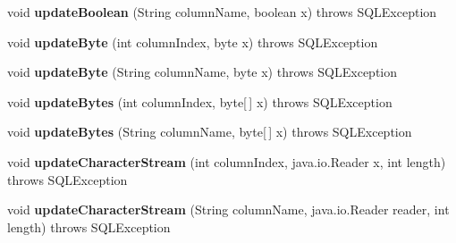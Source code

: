 \begin{DoxyCompactItemize}
void {\bfseries update\+Boolean} (String column\+Name, boolean x)  throws S\+Q\+L\+Exception 
\item 
\mbox{\label{classcom_1_1mysql_1_1cj_1_1jdbc_1_1result_1_1_result_set_impl_ac4d0f449cc4fd29b89f1ceb6b72209ae}} 
void {\bfseries update\+Byte} (int column\+Index, byte x)  throws S\+Q\+L\+Exception 
\item 
\mbox{\label{classcom_1_1mysql_1_1cj_1_1jdbc_1_1result_1_1_result_set_impl_ae8fd5cb7b758693b2db4729b2ffec9ae}} 
void {\bfseries update\+Byte} (String column\+Name, byte x)  throws S\+Q\+L\+Exception 
\item 
\mbox{\label{classcom_1_1mysql_1_1cj_1_1jdbc_1_1result_1_1_result_set_impl_a48efa493f35509f2dabf0b91d8b4a038}} 
void {\bfseries update\+Bytes} (int column\+Index, byte\mbox{[}$\,$\mbox{]} x)  throws S\+Q\+L\+Exception 
\item 
\mbox{\label{classcom_1_1mysql_1_1cj_1_1jdbc_1_1result_1_1_result_set_impl_ada2b7281c3af8825a8ec5350b7c36e20}} 
void {\bfseries update\+Bytes} (String column\+Name, byte\mbox{[}$\,$\mbox{]} x)  throws S\+Q\+L\+Exception 
\item 
\mbox{\label{classcom_1_1mysql_1_1cj_1_1jdbc_1_1result_1_1_result_set_impl_a250abe8a9f81e016d55af6d012771742}} 
void {\bfseries update\+Character\+Stream} (int column\+Index, java.\+io.\+Reader x, int length)  throws S\+Q\+L\+Exception 
\item 
\mbox{\label{classcom_1_1mysql_1_1cj_1_1jdbc_1_1result_1_1_result_set_impl_a16ea8e136afc00de800ef95377d4c589}} 
void {\bfseries update\+Character\+Stream} (String column\+Name, java.\+io.\+Reader reader, int length)  throws S\+Q\+L\+Exception 
\item 
\mbox{\label{classcom_1_1mysql_1_1cj_1_1jdbc_1_1result_1_1_result_set_impl_aa4b5c8494246c94994d1d5b0d54cd5f9}} 

\end{DoxyCompactItemize}

